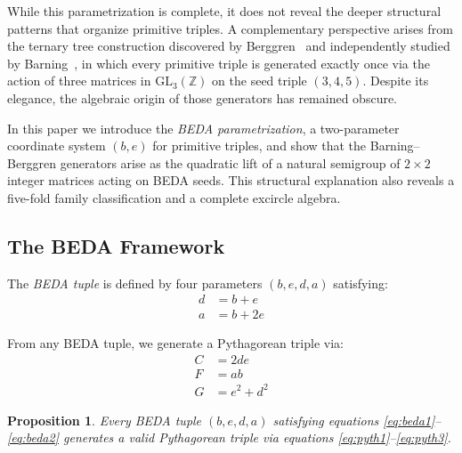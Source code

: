 \documentclass[12pt]{article}
\newtheorem{proposition}[theorem]{Proposition}
\begin{document}
While this parametrization is complete, it does not reveal the deeper structural
patterns that organize primitive triples.  A complementary perspective arises from
the ternary tree construction discovered by Berggren~\cite{berggren} and
independently studied by Barning~\cite{barning}, in which every primitive triple is
generated exactly once via the action of three matrices in $\mathrm{GL}_3(\mathbb{Z})$
on the seed triple $(3,4,5)$.  Despite its elegance, the algebraic origin of
those generators has remained obscure.

In this paper we introduce the \emph{BEDA parametrization}, a two-parameter
coordinate system $(b,e)$ for primitive triples, and show that the Barning--Berggren
generators arise as the quadratic lift of a natural semigroup of $2\times2$ integer
matrices acting on BEDA seeds.  This structural explanation also reveals a
five-fold family classification and a complete excircle algebra.

\subsection{The BEDA Framework}

The \emph{BEDA tuple} is defined by four parameters $(b, e, d, a)$ satisfying:
\begin{align}
d &= b + e \label{eq:beda1}\\
a &= b + 2e \label{eq:beda2}
\end{align}

From any BEDA tuple, we generate a Pythagorean triple via:
\begin{align}
C &= 2de \label{eq:pyth1}\\
F &= ab \label{eq:pyth2}\\
G &= e^2 + d^2 \label{eq:pyth3}
\end{align}

\begin{proposition}
Every BEDA tuple $(b, e, d, a)$ satisfying equations \eqref{eq:beda1}--\eqref{eq:beda2} generates a valid Pythagorean triple via equations \eqref{eq:pyth1}--\eqref{eq:pyth3}.
\end{proposition}
\end{document}
